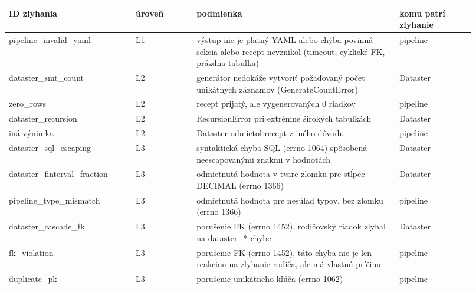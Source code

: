 \begin{table}[H]
    \centering
    \small
    \begin{tabular}{>{\raggedright\arraybackslash}p{0.25\linewidth}>{\centering\arraybackslash}p{0.12\linewidth}>{\raggedright\arraybackslash}p{0.4\linewidth}>{\centering\arraybackslash}p{0.15\linewidth}}
    \toprule
    \textbf{ID zlyhania} & \textbf{úroveň} & \textbf{podmienka} & \textbf{komu patrí zlyhanie} \\
    \midrule
        pipeline\_invalid\_yaml & L1 & výstup nie je platný YAML alebo chýba povinná sekcia alebo recept nevznikol (timeout, cyklické FK, prázdna tabuľka) & pipeline \\
         
        dataster\_smt\_count & L2 & generátor nedokáže vytvoriť požadovaný počet unikátnych záznamov (GenerateCountError) & Dataster \\
         
        zero\_rows & L2 & recept prijatý, ale vygenerovaných 0 riadkov & pipeline \\

         dataster\_recursion & L2 & RecursionError pri extrémne širokých tabuľkách & Dataster\\
         
         iná výnimka & L2 & Dataster odmietol recept z iného dôvodu & pipeline \\
         
        dataster\_sql\_escaping & L3 &  syntaktická chyba SQL (errno 1064) spôsobená neescapovanými znakmi v hodnotách & Dataster \\
         
        dataster\_finterval\_fraction & L3 & odmietnutá hodnota v tvare zlomku pre stĺpec DECIMAL (errno 1366) & Dataster \\
         
        pipeline\_type\_mismatch & L3 &  odmietnutá hodnota pre nesúlad typov, bez zlomku (errno 1366) & pipeline \\
        
        dataster\_cascade\_fk & L3 & porušenie FK (errno 1452), rodičovský riadok zlyhal na dataster\_* chybe  & Dataster \\
        
        fk\_violation & L3 & porušenie FK (errno 1452), táto chyba nie je len reakciou na zlyhanie rodiča, ale má vlastnú príčinu & pipeline\\
        
        duplicate\_pk & L3 & porušenie unikátneho kľúča (errno 1062) &  pipeline\\
        

\end{tabular}
\end{table}
